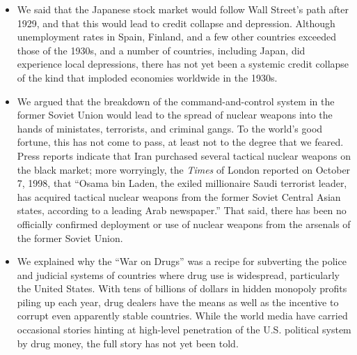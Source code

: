 \begin{paracol}{2}
\switchcolumn
\begin{itemize}
    \item We said that the Japanese stock market would follow Wall Street's path after 1929, and that this would lead to credit collapse and depression. Although unemployment rates in Spain, Finland, and a few other countries exceeded those of the 1930s, and a number of countries, including Japan, did experience local depressions, there has not yet been a systemic credit collapse of the kind that imploded economies worldwide in the 1930s.
    \item We argued that the breakdown of the command-and-control system in the former Soviet Union would lead to the spread of nuclear weapons into the hands of ministates, terrorists, and criminal gangs. To the world's good fortune, this has not come to pass, at least not to the degree that we feared. Press reports indicate that Iran purchased several tactical nuclear weapons on the black market; more worryingly, the \emph{Times} of London reported on October 7, 1998, that ``Osama bin Laden, the exiled millionaire Saudi terrorist leader, has acquired tactical nuclear weapons from the former Soviet Central Asian states, according to a leading Arab newspaper.'' That said, there has been no officially confirmed deployment or use of nuclear weapons from the arsenals of the former Soviet Union.
    \item We explained why the ``War on Drugs'' was a recipe for subverting the police and judicial systems of countries where drug use is widespread, particularly the United States. With tens of billions of dollars in hidden monopoly profits piling up each year, drug dealers have the means as well as the incentive to corrupt even apparently stable countries. While the world media have carried occasional stories hinting at high-level penetration of the U.S. political system by drug money, the full story has not yet been told.
\end{itemize}
\end{paracol}

